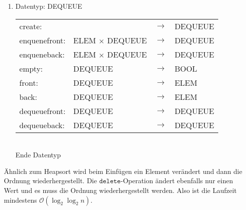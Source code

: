 \documentclass[a4paper,11pt]{article}             %
\begin{document}
\begin{enumerate}
\item Datentyp: DEQUEUE\\
\begin{tabular}{llcl}
create: && $\to$ & DEQUEUE\\
enquenefront: & ELEM $\times$ DEQUEUE & $\to$ & DEQUEUE\\
enqueneback: & ELEM $\times$ DEQUEUE & $\to$ & DEQUEUE\\
empty: & DEQUEUE & $\to$ & BOOL\\
front: & DEQUEUE & $\to$ & ELEM\\
back: & DEQUEUE & $\to$ & ELEM\\
dequeuefront: & DEQUEUE & $\to$ & DEQUEUE\\
dequeueback: & DEQUEUE & $\to$ & DEQUEUE
\end{tabular}\\
Ende Datentyp
\end{enumerate}

Ähnlich zum Heapsort wird beim Einfügen ein Element verändert und dann die Ordnung wiederhergestellt. Die $\texttt{delete}$-Operation ändert ebenfalls nur einen Wert und es muss die Ordnung wiederhergestellt werden. Also ist die Laufzeit mindestens $\mathcal O(\log_2\log_2 n)$.
\end{document}
